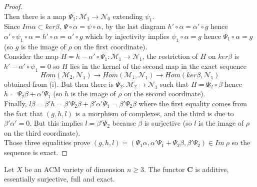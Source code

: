 \documentclass[
	oldfontcommands,
	sumario=abnt-6027-2012,
	12pt,			%
	openright,		%
	oneside,		%
	a4paper,		%
	english,		%
	brazil			%
	]{imecc-unicamp}
\begin{document}
\begin{proof}
\begin{equation}
\end{equation}
Then there is a map $\Psi_1:\mathcal{M}_1 \to \mathcal{N}_0$ extending $\psi_1$. \\ Since $Im \alpha \subset ker \beta$, $\Psi \circ \alpha = \psi \circ \alpha$, by the last diagram $h' \circ \alpha=\alpha' \circ g$ hence $\alpha' \circ \psi_1 \circ \alpha=h' \circ \alpha = \alpha' \circ g$ which by injectivity implies $\psi_1 \circ \alpha = g$ hence $\Psi_1 \circ \alpha = g$ (so $g$ is the image of $\rho$ on the first coordinate). \\
Consider the map $H=h-\alpha'\circ\Psi_1:\mathcal{M}_1 \to \mathcal{N}_1$, the restriction of $H$ on $ker \beta$ is $h'-\alpha'\circ\psi_1=0$ so $H$ lies in the kernel of the second map in the exact sequence
\begin{equation}
Hom(\mathcal{M}_2,\mathcal{N}_1) \to Hom(\mathcal{M}_1,\mathcal{N}_1) \to Hom(ker \beta, \mathcal{N}_1)
\end{equation}
obtained from (i). But then there is $\Psi_2:\mathcal{M}_2 \to \mathcal{N}_1$ such that $H=\Psi_2 \circ \beta$ hence $h=\Psi_2 \beta + \alpha' \Psi_1$ (so $h$ is the image of $\rho$ on the second coordinate). \\
Finally, $l \beta = \beta' h = \beta'\Psi_2 \beta + \beta' \alpha' \Psi_1= \beta' \Psi_2 \beta$ where the first equality comes from the fact that $(g,h,l)$ is a morphism of complexes, and the third is due to $\beta' \alpha'=0$. But this implies $l=\beta' \Psi_2$ because $\beta$ is surjective (so $l$ is the image of $\rho$ on the third coordinate). \\
Those three equalities prove $(g,h,l)=(\Psi_1 \alpha, \alpha'\Psi_1 + \Psi_2 \beta, \beta' \Psi_2) \in Im \ \rho$ so the sequence is exact.
\end{proof}
\begin{theorem}\cite[Jardim \& Martins, Theorem 2.6]{jardim2}
Let $X$ be an ACM variety of dimension $n \geq 3$. The functor $\textbf{C}$ is additive, essentially surjective, full and exact.
\end{theorem}
\end{document}
